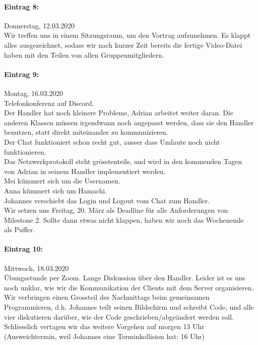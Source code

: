 \documentclass[12pt]{article}
\begin{document}
\paragraph{Eintrag 8:}
Donnerstag, 12.03.2020\\
Wir treffen uns in einem Sitzungsraum, um den Vortrag aufzunehmen. Es klappt alles ausgezeichnet, sodass wir nach kurzer Zeit bereits die fertige Video-Datei haben mit den Teilen von allen Gruppenmitgliedern.

\paragraph{Eintrag 9:}
Montag, 16.03.2020\\
Telefonkonferenz auf Discord.\\
Der Handler hat noch kleinere Probleme, Adrian arbeitet weiter daran. Die anderen Klassen m\"ussen irgendwann noch angepasst werden, dass sie den Handler benutzen, statt direkt miteinander zu kommunizieren.\\
Der Chat funktioniert schon recht gut, ausser dass Umlaute noch  nicht funktionieren.\\
Das Netzwerkprotokoll steht gr\"osstenteils, und wird in den kommenden Tagen von Adrian in seinem Handler implementiert werden.\\
Mei k\"ummert sich um die Usernamen.\\
Anna k\"ummert sich um Hamachi.\\
Johannes verschiebt das Login und Logout vom Chat zum Handler.\\
Wir setzen uns Freitag, 20. M\"arz als Deadline für alle Anforderungen von Milestone 2. Sollte dann etwas nicht klappen, haben wir noch das Wochenende als Puffer.

\paragraph{Eintrag 10:}
Mittwoch, 18.03.2020\\
\"Ubungsstunde per Zoom. Lange Diskussion \"uber den Handler. Leider ist es uns noch unklar, wie wir die Kommunikation der Clients mit dem Server organisieren. Wir verbringen einen Grossteil des Nachmittags beim gemeinsamen Programmieren, d.h. Johannes teilt seinen Bildschirm und schreibt Code, und alle vier diskutieren dar\"uber, wie der Code geschrieben/abge\"andert werden soll.\\
Schliesslich vertagen wir das weitere Vorgehen auf morgen 13 Uhr (Ausweichtermin, weil Johannes eine Terminkollision hat: 16 Uhr)
\end{document}
